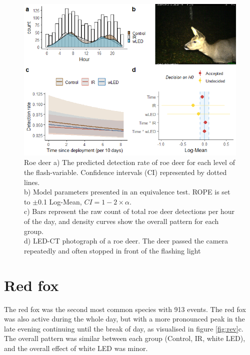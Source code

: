 \begin{table}[ht]
\begin{figure}
\centering
	\includegraphics[scale=.9]{../R/glmm_sp_files/figure-html/parameters-1.png}
\caption[Roe deer]
{Roe deer %
 a) The predicted detection rate of roe deer for each level of the flash-variable. Confidence intervals (CI) represented by dotted lines.\\
b) Model parameters presented in an equivalence test. ROPE is set to $\pm$0.1 Log-Mean, $CI =1 - 2\times \alpha$.\\ 
c) Bars represent the raw count of total roe deer detections per hour of the day, and density curves show the overall pattern for each group.\\
d) LED-CT photograph of a roe deer. The deer passed the camera repeatedly and often stopped in front of the flashing light}\label{fig:raadyr}
\end{figure}


\newpage
\section{Red fox}

The red fox was the second most common species with 913 events.
The red fox was also active during the whole day, but with a more pronounced peak in the late evening continuing until the break of day, as visualised in figure \ref{fig:rev}c.
The overall pattern was similar between each group (Control, IR, white LED), and the overall effect of white LED was minor.


\end{table}
